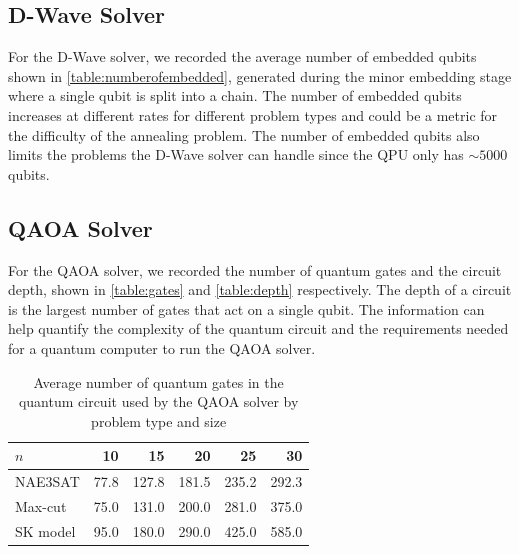 \subsection{D-Wave Solver}
For the D-Wave solver, we recorded the average number of embedded qubits shown in \autoref{table:numberofembedded}, generated during the minor embedding stage where a single qubit is split into a chain. The number of embedded qubits increases at different rates for different problem types and could be a metric for the difficulty of the annealing problem. The number of embedded qubits also limits the problems the D-Wave solver can handle since the QPU only has $\sim 5000$ qubits.
\begin{table}[!htb]
    \centering
    \caption{Average number of embedded qubits for the D-Wave solver by problem type and size}
    \label{table:numberofembedded}
\end{table}
\subsection{QAOA Solver}
For the QAOA solver, we recorded the number of quantum gates and the circuit depth, shown in \autoref{table:gates} and \autoref{table:depth} respectively. The depth of a circuit is the largest number of gates that act on a single qubit. The information can help quantify the complexity of the quantum circuit and the requirements needed for a quantum computer to run the QAOA solver.
\begin{table}[!htb]
    \centering
    \caption{Average number of quantum gates in the quantum circuit used by the QAOA solver by problem type and size}
    \label{table:gates}
    \begin{tabular}{lrrrrr} \toprule
        $n$ & 10 & 15 & 20 & 25 & 30\\ \midrule
        NAE3SAT & 77.8 & 127.8 & 181.5 & 235.2 & 292.3 \\
        Max-cut & 75.0 & 131.0 & 200.0 & 281.0 & 375.0 \\
        SK model & 95.0 & 180.0 & 290.0 & 425.0 & 585.0\\ \bottomrule
    \end{tabular}
\end{table}

